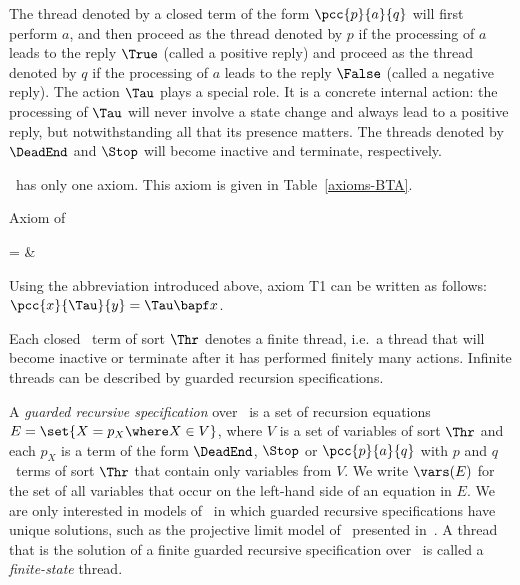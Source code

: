 \documentclass[fleqn]{llncs}
\begin{document}
The thread denoted by a closed term of the form $\pcc{p}{a}{q}$ will
first perform $a$, and then proceed as the thread denoted by $p$ if the
processing of $a$ leads to the reply $\True$ (called a positive reply)
and proceed as the thread denoted by $q$ if the processing of $a$ leads
to the reply $\False$ (called a negative reply).
The action $\Tau$ plays a special role.
It is a concrete internal action: the processing of $\Tau$ will never
involve a state change and always lead to a positive reply, but
notwithstanding all that its presence matters.
The threads denoted by $\DeadEnd$ and $\Stop$ will become inactive and
terminate, respectively.

\BTA\ has only one axiom.
This axiom is given in Table~\ref{axioms-BTA}.\begin{table}[!t]
\caption{Axiom of \BTA}
\label{axioms-BTA}
\begin{eqntbl}
\begin{axcol}
 =                       & 
\end{axcol}
\end{eqntbl}
\end{table}
Using the abbreviation introduced above, axiom T1 can be written as
follows: $\pcc{x}{\Tau}{y} = \Tau \bapf x$.

Each closed \BTA\ term of sort $\Thr$ denotes a finite thread, i.e.\ a
thread that will become inactive or terminate after it has performed
finitely many actions.
Infinite threads can be described by guarded recursion specifications.

A \emph{guarded recursive specification} over \BTA\ is a set of
recursion equations $E = \set{X = p_X \where X \in V}$, where $V$ is a
set of variables of sort $\Thr$ and each $p_X$ is a term of the form
$\DeadEnd$, $\Stop$ or $\pcc{p}{a}{q}$ with $p$ and $q$ \BTA\ terms
of sort $\Thr$ that contain only variables from $V$.
We write $\vars(E)$ for the set of all variables that occur on the
left-hand side of an equation in $E$.
We are only interested in models of \BTA\ in which guarded recursive
specifications have unique solutions, such as the projective limit model
of \BTA\ presented in~\cite{BB03a}.
A thread that is the solution of a finite guarded recursive
specification over \BTA\ is called a \emph{finite-state} thread.
\end{document}
